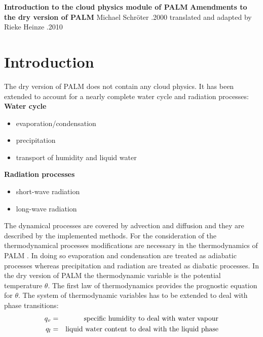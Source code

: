 \documentclass[11pt,a4paper]{scrartcl}
\begin{document}
\begin{center}
{\LARGE\bf\textsf{Introduction to the cloud physics module of PALM}}
\vspace{3.0mm}
\linebreak
{\Large\bf\textsf{\textendash Amendments to the dry version of PALM\textendash}}
\linebreak
\linebreak
 Michael Schr\"{o}ter
.2000
\linebreak
translated and adapted by 
\linebreak
Rieke Heinze 
.2010
\end{center}

\section{Introduction}
The dry version of PALM does not contain any cloud physics. It has been extended 
to account for a nearly complete water cycle and radiation processes:
\vspace{0.2cm}
\newline
{\bf\textsf{Water cycle}}
\begin{itemize}
 \item evaporation/condensation
 \item precipitation
 \item transport of humidity and liquid water 
\end{itemize}
{\bf\textsf{Radiation processes}}
\begin{itemize}
 \item short-wave radiation
 \item long-wave radiation
\end{itemize}
The dynamical processes are covered by advection and diffusion and they are described by the implemented methods. For the consideration of the
thermodynamical processes modifications are necessary in the thermodynamics of PALM . In doing so evaporation and condensation are treated as 
adiabatic processes whereas precipitation and radiation are treated as diabatic processes. In the dry version of PALM the thermodynamic variable 
is the potential temperature $\theta$. The first law of thermodynamics provides the prognostic equation 
for $\theta$. The system of thermodynamic variables has to be extended to deal with phase transitions:
\begin{eqnarray*}
 q_{v} & = &\textnormal{specific humidity to deal with water vapour} \\
 q_{l} & = &\textnormal{liquid water content to deal with the liquid phase}
\end{eqnarray*}
\end{document}
